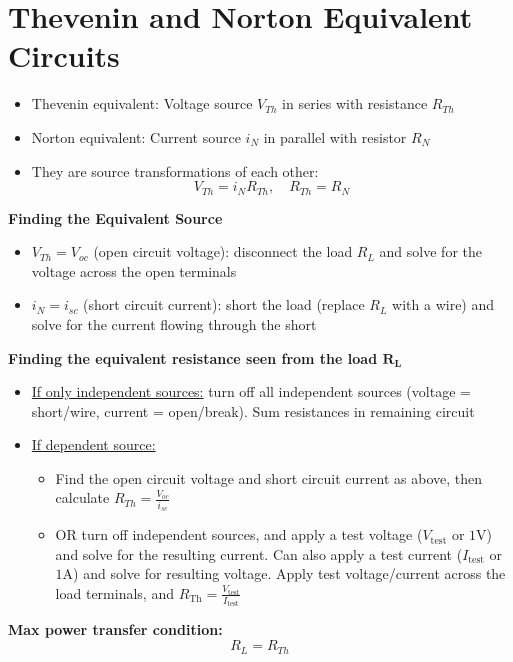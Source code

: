 \documentclass[12pt]{article}
\begin{document}
\section*{Thevenin and Norton Equivalent Circuits}
\begin{itemize}
    \item Thevenin equivalent: Voltage source $V_{Th}$ in series with resistance $R_{Th}$
    \item Norton equivalent: Current source $i_{N}$ in parallel with resistor $R_{N}$
    \item They are source transformations of each other:
    \[ V_{Th} = i_N R_{Th}, \quad R_{Th} = R_N \]
\end{itemize}
\textbf{Finding the Equivalent Source}
\begin{itemize}
    \item $V_{Th}=V_{oc}$ (open circuit voltage): disconnect the load $R_L$ and solve for the voltage across the open terminals
    \item $i_{N}=i_{sc}$ (short circuit current): short the load (replace $R_L$ with a wire) and solve for the current flowing through the short
\end{itemize}
\textbf{Finding the equivalent resistance seen from the load $\mathbf{R_L}$}
\begin{itemize}
    \item \underline{If only independent sources:} turn off all independent sources (voltage = short/wire, current = open/break). Sum resistances in remaining circuit
    \item \underline{If dependent source:}
    \begin{itemize}
        \item Find the open circuit voltage and short circuit current as above, then calculate $R_{Th} = \frac{V_{oc}}{i_{sc}}$
        \item OR turn off independent sources, and apply a test voltage ($V_\text{test}$ or $1\text{V}$) and solve for the resulting current. Can also apply a test current ($I_\text{test}$ or $1\text{A}$) and solve for resulting voltage. Apply test voltage/current across the load terminals, and $R_\text{Th} = \frac{V_\text{test}}{I_\text{test}}$
    \end{itemize}
\end{itemize}
\textbf{Max power transfer condition:}
\[R_L = R_{Th}\]
\newpage
\end{document}
